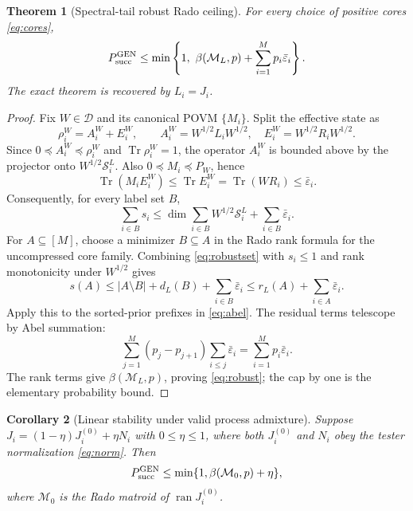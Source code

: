 \documentclass[11pt]{article}
\newtheorem{theorem}{Theorem}[section]
\newtheorem{corollary}[theorem]{Corollary}
\theoremstyle{definition}
\theoremstyle{remark}
\newcommand{\ran}{\operatorname{ran}}
\newcommand{\Tr}{\operatorname{Tr}}
\newcommand{\cD}{\mathcal D}
\newcommand{\cM}{\mathcal M}
\newcommand{\cS}{\mathcal S}
\begin{document}
\begin{theorem}[Spectral-tail robust Rado ceiling]\label{thm:robust}
For every choice of positive cores \cref{eq:cores},
\begin{equation}
 P_{\rm succ}^{\rm GEN}
 \leq \min\left\{1,\ \beta(\cM_L,p)
                     +\sum_{i=1}^{M}p_i\bar\varepsilon_i\right\}.
                                                               \label{eq:robust}
\end{equation}
The exact theorem is recovered by $L_i=J_i$.
\end{theorem}

\begin{proof}
Fix $W\in\cD$ and its canonical POVM $\{M_i\}$.  Split the effective state as
\[
 \rho_i^W=A_i^W+E_i^W,\qquad
 A_i^W=W^{1/2}L_iW^{1/2},\quad
 E_i^W=W^{1/2}R_iW^{1/2}.
\]
Since $0\preceq A_i^W\preceq\rho_i^W$ and $\Tr\rho_i^W=1$, the operator
$A_i^W$ is bounded above by the projector onto
$W^{1/2}\cS_i^L$.  Also $0\preceq M_i\preceq P_W$, hence
\[
 \Tr(M_iE_i^W)\leq\Tr E_i^W=\Tr(WR_i)
 \leq\bar\varepsilon_i.
\]
Consequently, for every label set $B$,
\begin{equation}
 \sum_{i\in B}s_i
 \leq \dim\sum_{i\in B}W^{1/2}\cS_i^L
      +\sum_{i\in B}\bar\varepsilon_i.                 \label{eq:robustset}
\end{equation}
For $A\subseteq[M]$, choose a minimizer $B\subseteq A$ in the Rado rank
formula for the uncompressed core family.  Combining
\cref{eq:robustset} with $s_i\leq1$ and rank monotonicity under $W^{1/2}$
gives
\[
 s(A)\leq |A\setminus B|+d_L(B)
              +\sum_{i\in B}\bar\varepsilon_i
       \leq r_L(A)+\sum_{i\in A}\bar\varepsilon_i.
\]
Apply this to the sorted-prior prefixes in \cref{eq:abel}.  The residual
terms telescope by Abel summation:
\[
 \sum_{j=1}^{M}(p_j-p_{j+1})
        \sum_{i\leq j}\bar\varepsilon_i
 =\sum_{i=1}^{M}p_i\bar\varepsilon_i.
\]
The rank terms give $\beta(\cM_L,p)$, proving \cref{eq:robust}; the cap by one
is the elementary probability bound.
\end{proof}

\begin{corollary}[Linear stability under valid process admixture]
Suppose $J_i=(1-\eta)J_i^{(0)}+\eta N_i$ with $0\leq\eta\leq1$, where both
$J_i^{(0)}$ and $N_i$ obey the tester normalization \cref{eq:norm}.  Then
\begin{equation}
 P_{\rm succ}^{\rm GEN}
 \leq\min\{1,\beta(\cM_0,p)+\eta\},                    \label{eq:mixture}
\end{equation}
where $\cM_0$ is the Rado matroid of $\ran J_i^{(0)}$.
\end{corollary}
\end{document}
